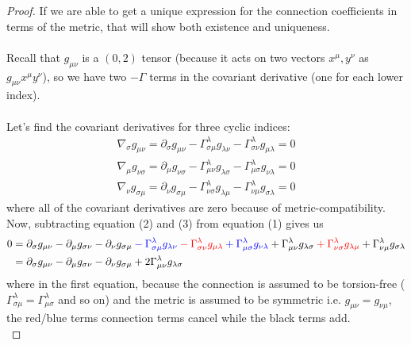 \documentclass[11pt]{article}
\begin{document}
\begin{proof}
  If we are able to get a unique expression for the connection coefficients in terms of the metric, that will show both existence and uniqueness.
  \\
  \\
  Recall that $g_{\mu \nu}$ is a $(0, 2)$ tensor (because it acts on two vectors $x^{\mu}, y^{\nu}$ as $g_{\mu \nu}x^{\mu}y^{\nu}$), so we have two $-\Gamma$ terms in the covariant derivative (one for each lower index).
  \\
  \\
  Let's find the covariant derivatives for three cyclic indices:
  \begin{align}
    \nabla_{\sigma} g_{\mu \nu} = \partial_{\sigma} g_{\mu \nu} - \Gamma_{\sigma \mu}^{\lambda} g_{\lambda \nu} - \Gamma_{\sigma \nu}^{\lambda} g_{\mu \lambda} = 0\\
    \nabla_{\mu} g_{\nu \sigma} = \partial_{\mu} g_{\nu \sigma} - \Gamma_{\mu \nu}^{\lambda} g_{\lambda \sigma} - \Gamma_{\mu \sigma}^{\lambda} g_{\nu \lambda} = 0 \\
    \nabla_{\nu} g_{\sigma \mu} = \partial_{\nu} g_{\sigma \mu} - \Gamma_{\nu \sigma}^{\lambda} g_{\lambda \mu} - \Gamma_{\nu \mu}^{\lambda} g_{\sigma \lambda} = 0
  \end{align}
  where all of the covariant derivatives are zero because of metric-compatibility. Now, subtracting equation (2) and (3) from equation (1) gives us 
  \begin{align*}
    0 &= \partial_{\sigma} g_{\mu \nu} -  \partial_{\mu} g_{\sigma \nu} - \partial_{\nu} g_{\sigma \mu}  \color{blue}  - \Gamma_{\sigma \mu}^{\lambda} g_{\lambda \nu}  \color{red}  - \Gamma_{\sigma \nu}^{\lambda} g_{\mu \lambda}  \color{blue}  + \Gamma_{\mu \sigma}^{\lambda} g_{\nu \lambda}  \color{black} +  \Gamma_{\mu \nu}^{\lambda} g_{\lambda \sigma}  \color{red}  + \Gamma_{\nu \sigma}^{\lambda} g_{\lambda \mu}  \color{black}  + \Gamma_{\nu \mu}^{\lambda} g_{\sigma \lambda} \\
    &= \partial_{\sigma} g_{\mu \nu} -  \partial_{\mu} g_{\sigma \nu} - \partial_{\nu} g_{\sigma \mu} + 2\Gamma_{\mu \nu}^{\lambda} g_{\lambda \sigma} 
  \end{align*}
  where in the first equation, because the connection is assumed to be torsion-free ($\Gamma_{\sigma \mu}^{\lambda} = \Gamma_{\mu \sigma}^{\lambda}$ and so on) and the metric is assumed to be symmetric i.e. $g_{\mu \nu} = g_{\nu \mu}$, the red/blue terms connection terms cancel while the black terms add.
  \\

\end{proof}
\end{document}
